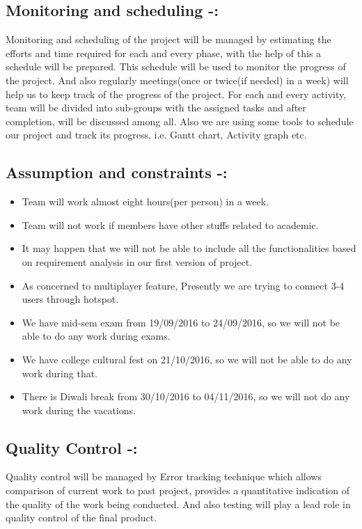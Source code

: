 \documentclass[]{article}
\begin{document}
\subsection{Monitoring and scheduling -:}
Monitoring and scheduling of the project will be managed by estimating the efforts and
time required for each and every phase, with the help of this a schedule will be prepared.
This schedule will be used to monitor the progress of the project. And also regularly
meetings(once or twice(if needed) in a week) will help us to keep track of the progress of
the project. For each and every activity, team will be divided into sub-groups with the
assigned tasks and after completion, will be discussed among all. Also we are using some
tools to schedule our project and track its progress, i.e. Gantt chart, Activity graph etc.

\subsection{Assumption and constraints -:}
\begin{itemize}


\item Team will work almost eight hours(per person) in a week.
\item  Team will not work if members have other stuffs related to academic.
\item It may happen that we will not be able to include all the functionalities based on
requirement analysis in our first version of project.
\item As concerned to multiplayer feature, Presently we are trying to connect 3-4 users through
hotspot.
\item We have mid-sem exam from 19/09/2016 to 24/09/2016, so we will not be able to do any
work during exams.
\item We have college cultural fest on 21/10/2016, so we will not be able to do any work
during that.
\item There is Diwali break from 30/10/2016 to 04/11/2016, so we will not do any work during
the vacations.
\end{itemize}
\subsection{Quality Control -:}
Quality control will be managed by Error tracking technique which allows comparison of
current work to past project, provides a quantitative indication of the quality of the work being
conducted. And also testing will play a lead role in quality control of the final product.
\end{document}

